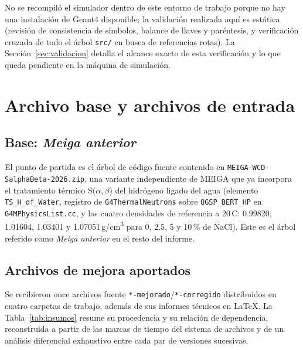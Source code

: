 \documentclass[11pt,a4paper]{article}
\newcommand{\codigo}[1]{\nolinkurl{#1}}
\begin{document}
No se recompiló el simulador dentro de este entorno de trabajo porque no
hay una instalación de Geant4 disponible; la validación realizada aquí es
estática (revisión de consistencia de símbolos, balance de llaves y
paréntesis, y verificación cruzada de todo el árbol \codigo{src/} en busca
de referencias rotas). La Sección~\ref{sec:validacion} detalla el alcance
exacto de esta verificación y lo que queda pendiente en la máquina de
simulación.

\section{Archivo base y archivos de entrada}

\subsection{Base: \emph{Meiga anterior}}

El punto de partida es el árbol de código fuente contenido en
\codigo{MEIGA-WCD-SalphaBeta-2026.zip}, una variante independiente de MEIGA
que ya incorpora el tratamiento térmico S($\alpha,\beta$) del hidrógeno
ligado del agua (elemento \codigo{TS\_H\_of\_Water}, registro de
\codigo{G4ThermalNeutrons} sobre \codigo{QGSP\_BERT\_HP} en
\codigo{G4MPhysicsList.cc}, y las cuatro densidades de referencia a
20\,\textdegree C: 0.99820, 1.01604, 1.03401 y 1.07051\,g/cm\textsuperscript{3}
para 0, 2.5, 5 y 10\,\% de NaCl). Este es el árbol referido como
\emph{Meiga anterior} en el resto del informe.

\subsection{Archivos de mejora aportados}

Se recibieron once archivos fuente \codigo{*-mejorado}/\codigo{*-corregido}
distribuidos en cuatro carpetas de trabajo, además de sus informes
técnicos en \LaTeX. La Tabla~\ref{tab:insumos} resume su procedencia y su
relación de dependencia, reconstruida a partir de las marcas de tiempo del
sistema de archivos y de un análisis diferencial exhaustivo entre cada par
de versiones sucesivas.
\end{document}
